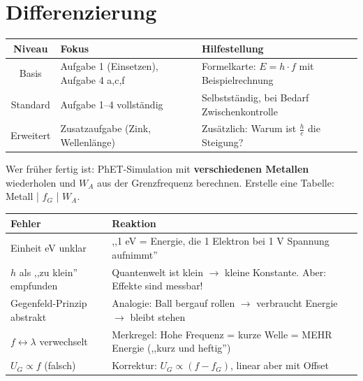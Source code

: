 \documentclass[11pt,a4paper]{article}
\begin{document}
\vspace{1em}


\section*{Differenzierung}

\begin{tabularx}{\textwidth}{|c|X|X|}
\hline
\rowcolor{physiklight}
\textbf{Niveau} & \textbf{Fokus} & \textbf{Hilfestellung} \\
\hline
Basis & Aufgabe 1 (Einsetzen), Aufgabe 4 a,c,f & Formelkarte: $E = h \cdot f$ mit Beispielrechnung \\
\hline
Standard & Aufgabe 1--4 vollständig & Selbstständig, bei Bedarf Zwischenkontrolle \\
\hline
Erweitert & Zusatzaufgabe (Zink, Wellenlänge) & Zusätzlich: Warum ist $\frac{h}{e}$ die Steigung? \\
\hline
\end{tabularx}

\vspace{0.5em}

\begin{tcolorbox}[tipbox={Tipp für schnelle SuS}]
Wer früher fertig ist: PhET-Simulation mit \textbf{verschiedenen Metallen} wiederholen und $W_A$ aus der Grenzfrequenz berechnen. Erstelle eine Tabelle: Metall | $f_G$ | $W_A$.
\end{tcolorbox}

\vspace{0.5em}


\begin{tcolorbox}[warnbox={Häufige Schülerfehler \& Reaktionen}]
\begin{tabularx}{\textwidth}{lX}
\textbf{Fehler} & \textbf{Reaktion} \\
\hline
Einheit eV unklar & ,,1 eV = Energie, die 1 Elektron bei 1 V Spannung aufnimmt'' \\
\hline
$h$ als ,,zu klein'' empfunden & Quantenwelt ist klein $\rightarrow$ kleine Konstante. Aber: Effekte sind messbar! \\
\hline
Gegenfeld-Prinzip abstrakt & Analogie: Ball bergauf rollen $\rightarrow$ verbraucht Energie $\rightarrow$ bleibt stehen \\
\hline
$f \leftrightarrow \lambda$ verwechselt & Merkregel: Hohe Frequenz = kurze Welle = MEHR Energie (,,kurz und heftig'') \\
\hline
$U_G \propto f$ (falsch) & Korrektur: $U_G \propto (f - f_G)$, linear aber mit Offset \\
\hline
\end{tabularx}
\end{tcolorbox}
\end{document}
